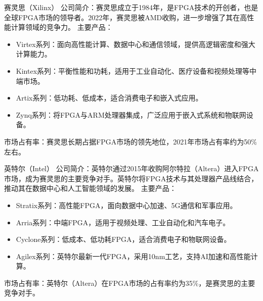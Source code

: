 \documentclass[
  ignorenonframetext,
  chinese,
]{beamer}
\providecommand{\tightlist}{%
  \setlength{\itemsep}{0pt}\setlength{\parskip}{0pt}}
\begin{document}
\begin{frame}
\begin{block}{赛灵思（Xilinx）}
\label{ux8d5bux7075ux601dxilinx}
公司简介：赛灵思成立于1984年，是FPGA技术的开创者，也是全球FPGA市场的领导者。2022年，赛灵思被AMD收购，进一步增强了其在高性能计算领域的竞争力。
主要产品：

\begin{itemize}
\tightlist
\item
  Virtex系列：面向高性能计算、数据中心和通信领域，提供高逻辑密度和强大计算能力。
\item
  Kintex系列：平衡性能和功耗，适用于工业自动化、医疗设备和视频处理等中端市场。
\item
  Artix系列：低功耗、低成本，适合消费电子和嵌入式应用。
\item
  Zynq系列：将FPGA与ARM处理器集成，广泛应用于嵌入式系统和物联网设备。
\end{itemize}

市场占有率：赛灵思长期占据FPGA市场的领先地位，2021年市场占有率约为50\%左右。
\end{block}
\end{frame}

\begin{frame}
\begin{block}{英特尔（Intel）}
\label{ux82f1ux7279ux5c14intel}
公司简介：英特尔通过2015年收购阿尔特拉（Altera）进入FPGA市场，成为赛灵思的主要竞争对手。英特尔将FPGA技术与其处理器产品线结合，推动其在数据中心和人工智能领域的发展。
主要产品：

\begin{itemize}
\tightlist
\item
  Stratix系列：高性能FPGA，面向数据中心加速、5G通信和军事应用。
\item
  Arria系列：中端FPGA，适用于视频处理、工业自动化和汽车电子。
\item
  Cyclone系列：低成本、低功耗FPGA，适合消费电子和物联网设备。
\item
  Agilex系列：英特尔最新一代FPGA，采用10nm工艺，支持AI加速和高性能计算。
\end{itemize}

市场占有率：英特尔（Altera）在FPGA市场的占有率约为35\%，是赛灵思的主要竞争对手。
\end{block}
\end{frame}
\end{document}
